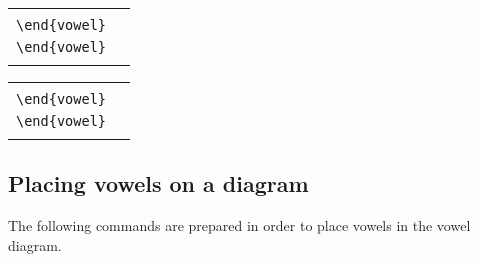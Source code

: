 \documentclass[a4paper]{article}
\begin{document}
\begin{center}
\begin{tabular}{ll}
  \begin{minipage}[t]{5.5cm}{\small
    \verb|\begin{vowel}[plain,triangle]|\\
    \verb|\end{vowel}|}
  \end{minipage} &
  \begin{minipage}[t]{5.5cm}{\small
    \verb|\begin{vowel}[simple,triangle]|\\
    \verb|\end{vowel}|}
  \end{minipage} \\
  \begin{vowel}\end{vowel} &
  \begin{vowel}\end{vowel}
\end{tabular}

\begin{tabular}{ll}
  \begin{minipage}[t]{5cm}{\small
    \verb|\begin{vowel}[simple,three]|\\
    \verb|\end{vowel}|}
  \end{minipage} &
  \begin{minipage}[t]{6cm}{\small
    \verb|\begin{vowel}[simple,triangle,three]|\\
    \verb|\end{vowel}|}
  \end{minipage} \\
  \begin{vowel}\end{vowel} &
  \hspace{.5cm}\begin{vowel}\end{vowel}
\end{tabular}
\end{center}


\subsection{Placing vowels on a diagram}

The following commands are prepared in order to place vowels in the
vowel diagram.
\end{document}
